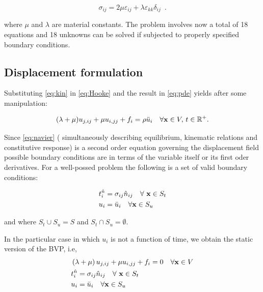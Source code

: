 \begin{equation} \label{eq:Hooke}
\sigma_{ij} = 2\mu \varepsilon_{ij} + \lambda \varepsilon_{kk}\delta_{ij} \enspace .
\end{equation}

where $\mu$ and $\lambda$ are material constants. The problem involves now a total of 18 equations and 18 unknowns can be solved if subjected to properly specified boundary conditions.

\subsection*{Displacement formulation}
Substituting \cref{eq:kin} in \cref{eq:Hooke} and the result in \cref{eq:pde} yields after some manipulation:

\begin{equation} \label{eq:navier}
(\lambda  + \mu)u_{j,ij} + \mu u_{i,jj} + {f_i} = \rho \ddot{u}_i \quad \forall \vb{x} \in V,\, t \in \mathbb{R}^{+}.
\end{equation}

Since \cref{eq:navier} ( simultaneously describing equilibrium, kinematic relations and constitutive response) is a second order equation governing the displacement field possible boundary conditions are in terms of the variable itself or its first oder derivatives. For a well-possed problem the following is a set of valid boundary conditions: 

\begin{equation} \label{eq:Wellbcs}
\begin{split}
&t_i^{\hat n} = \sigma _{ij} \hat n_{ij} \quad \forall\ \vb{x} \in S_t\\
& {u_i} = \bar{u}_i \quad \forall \vb x \in S_u
\end{split}
\end{equation}

and where ${S_t} \cup {S_u} = S$ and ${S_t} \cap {S_u} = \emptyset $. 


In the particular case in which $u_i$ is not a function of time, we obtain the static version of the BVP, i.e,
\begin{equation}
\begin{split}
&\left(\lambda  + \mu \right)u_{j,ij} + \mu u_{i,jj} + {f_i} = 0 \quad \forall \vb{x} \in V \\
&t_i^{\hat n} = \sigma _{ij} \hat n_{ij} \quad \forall\ \vb{x} \in S_t\\
& {u_i} = \bar{u}_i \quad \forall \vb x \in S_u
\end{split}
\end{equation}


